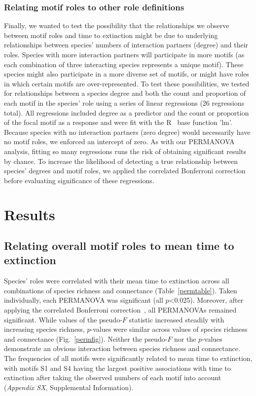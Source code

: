 \documentclass[12pt]{article}
\begin{document}
    \subsubsection*{Relating motif roles to other role definitions}
    
      Finally, we wanted to test the possibility that the relationships we observe between motif roles and time to extinction might be due to underlying relationships between species' numbers of interaction partners (degree) and their roles.
      Species with more interaction partners will participate in more motifs (as each combination of three interacting species represents a unique motif).
      These species might also participate in a more diverse set of motifs, or might have roles in which certain motifs are over-represented.
      To test these possibilities, we tested for relationships between a species degree and both the count and proportion of each motif in the species' role using a series of linear regressions (26 regressions total).
      All regressions included degree as a predictor and the count or proportion of the focal motif as a response and were fit with the R~\citep{R} base function 'lm'.
      Because species with no interaction partners (zero degree) would necessarily have no motif roles, we enforced an intercept of zero.
      As with our PERMANOVA analysis, fitting so many regressions runs the risk of obtaining significant results by chance.
      To increase the likelihood of detecting a true relationship between species' degrees and motif roles, we applied the correlated Bonferroni correction~\citep{Drezner2016} before evaluating significance of these regressions.


\section{Results}
  
    \subsection*{Relating overall motif roles to mean time to extinction}
    
    Species' roles were correlated with their mean time to extinction across all combinations of species richness and connectance (Table~\ref{permtable}). Taken individually, each PERMANOVA was significant (all $p$\textless0.025). Moreover, after applying the correlated Bonferroni correction~\citep{Drezner2016}, all PERMANOVAs remained significant. While values of the pseudo-$F$ statistic increased steadily with increasing species richness, $p$-values were similar across values of species richness and connectance (Fig.~\ref{permfig}). Neither the pseudo-$F$ nor the $p$-values demonstrate an obvious interaction between species richness and connectance.
        The frequencies of all motifs were significantly related to mean time to extinction, with motifs S1 and S4 having the largest positive associations with time to extinction after taking the observed numbers of each motif into account (\emph{Appendix SX}, Supplemental Information).
\end{document}
